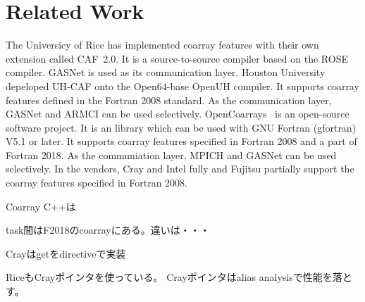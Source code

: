 \section{Related Work}\label{sec:related}

The Universicy of Rice has implemented coarray features with their own extension called CAF~2.0.
It is a source-to-source compiler based on the ROSE compiler. GASNet is used as its 
communication layer.
%
Houston University depeloped UH-CAF onto the Open64-base OpenUH compiler. It supports
coarray features defined in the Fortran 2008 standard. As the communication layer,
GASNet and ARMCI can be used selectively.
%
OpenCoarrays~\cite{OpenCo} is an open-source software project. It is an library 
which can be used with GNU Fortran (gfortran) V5.1 or later. It supports coarray features
specified in Fortran 2008 and a part of Fortran 2018.  As the communiation layer,
MPICH and GASNet can be used selectively.
%
In the vendors, Cray and Intel fully and Fujitsu partially support the coarray features
specified in Fortran 2008.

Coarray C++は

task間はF2018のcoarrayにある。違いは・・・

Crayはgetをdirectiveで実装

RiceもCrayポインタを使っている。
Crayポインタはalias analysisで性能を落とす。


